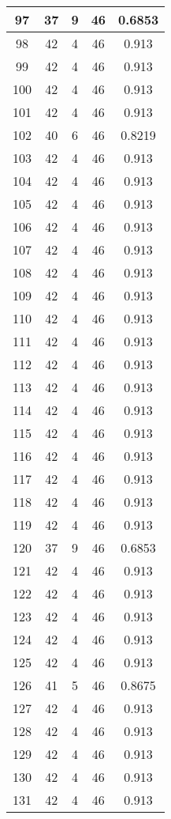\documentclass[letterpaper, 12pt]{article}
\begin{document}
\begin{longtable}{|c|c|c|c|c|}
\hline
97 & 37 & 9 & 46 & 0.6853 \\
\hline
98 & 42 & 4 & 46 & 0.913 \\
\hline
99 & 42 & 4 & 46 & 0.913 \\
\hline
100 & 42 & 4 & 46 & 0.913 \\
\hline
101 & 42 & 4 & 46 & 0.913 \\
\hline
102 & 40 & 6 & 46 & 0.8219 \\
\hline
103 & 42 & 4 & 46 & 0.913 \\
\hline
104 & 42 & 4 & 46 & 0.913 \\
\hline
105 & 42 & 4 & 46 & 0.913 \\
\hline
106 & 42 & 4 & 46 & 0.913 \\
\hline
107 & 42 & 4 & 46 & 0.913 \\
\hline
108 & 42 & 4 & 46 & 0.913 \\
\hline
109 & 42 & 4 & 46 & 0.913 \\
\hline
110 & 42 & 4 & 46 & 0.913 \\
\hline
111 & 42 & 4 & 46 & 0.913 \\
\hline
112 & 42 & 4 & 46 & 0.913 \\
\hline
113 & 42 & 4 & 46 & 0.913 \\
\hline
114 & 42 & 4 & 46 & 0.913 \\
\hline
115 & 42 & 4 & 46 & 0.913 \\
\hline
116 & 42 & 4 & 46 & 0.913 \\
\hline
117 & 42 & 4 & 46 & 0.913 \\
\hline
118 & 42 & 4 & 46 & 0.913 \\
\hline
119 & 42 & 4 & 46 & 0.913 \\
\hline
120 & 37 & 9 & 46 & 0.6853 \\
\hline
121 & 42 & 4 & 46 & 0.913 \\
\hline
122 & 42 & 4 & 46 & 0.913 \\
\hline
123 & 42 & 4 & 46 & 0.913 \\
\hline
124 & 42 & 4 & 46 & 0.913 \\
\hline
125 & 42 & 4 & 46 & 0.913 \\
\hline
126 & 41 & 5 & 46 & 0.8675 \\
\hline
127 & 42 & 4 & 46 & 0.913 \\
\hline
128 & 42 & 4 & 46 & 0.913 \\
\hline
129 & 42 & 4 & 46 & 0.913 \\
\hline
130 & 42 & 4 & 46 & 0.913 \\
\hline
131 & 42 & 4 & 46 & 0.913 \\

\end{longtable}
\end{document}
